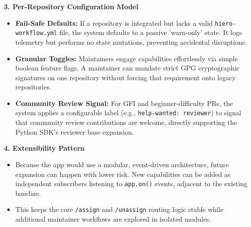 \documentclass[11pt]{article}
\begin{document}
\vspace{5pt}
\noindent
\textbf{3. Per-Repository Configuration Model}
\begin{itemize}[leftmargin=18pt,itemsep=2pt,topsep=0pt]
\item \textbf{Fail-Safe Defaults:} If a repository is integrated but lacks a valid \texttt{hiero-workflow.yml} file, the system defaults to a passive 'warn-only' state. It logs telemetry but performs no state mutations, preventing accidental disruptions.
\item \textbf{Granular Toggles:} Maintainers engage capabilities effortlessly via simple boolean feature flags. A maintainer can mandate strict GPG cryptographic signatures on one repository without forcing that requirement onto legacy repositories.
\item \textbf{Community Review Signal:} For GFI and beginner-difficulty PRs, the system applies a configurable label (e.g., \texttt{help-wanted: reviewer}) to signal that community review contributions are welcome, directly supporting the Python SDK's reviewer base expansion.
\end{itemize}

\vspace{5pt}
\noindent
\textbf{4. Extensibility Pattern}
\begin{itemize}[leftmargin=18pt,itemsep=2pt,topsep=0pt]
\item Because the app would use a modular, event-driven architecture, future expansion can happen with lower risk. New capabilities can be added as independent subscribers listening to \texttt{app.on()} events, adjacent to the existing baseline.
\item This keeps the core \texttt{/assign} and \texttt{/unassign} routing logic stable while additional maintainer workflows are explored in isolated modules.
\end{itemize}
\end{document}
